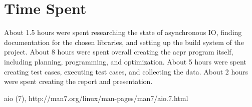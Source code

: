 \documentclass[11pt]{article}
\begin{document}
\section{Time Spent}

About 1.5 hours were spent researching the state of asynchronous IO, finding
documentation for the chosen libraries, and setting up the build system of the
project.
About 8 hours were spent overall creating the acpr program itself, including planning, programming, and optimization.
About 5 hours were spent creating test cases, executing test cases, and collecting the data.
About 2 hours were spent creating the report and presentation.

\begin{thebibliography}{99}
        aio (7), http://man7.org/linux/man-pages/man7/aio.7.html
\end{thebibliography}
\end{document}
